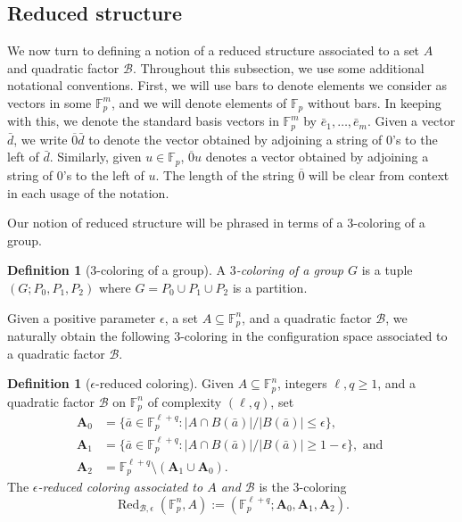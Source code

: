 \documentclass[12pt,oneside,british,a4wide]{amsart}
\numberwithin{equation}{section}
\theoremstyle{definition}
\newtheorem{definition}[theorem]{Definition}
\def\F{\mathbb{F}}
\def\e{\epsilon}
\newcommand{\abar}{\bar{a}}
\newcommand{\dbar}{\bar{d}}
\newcommand{\ebar}{\bar{e}}
\newcommand{\calB}{\mathcal{B}}
\newcommand{\Red}{{\mathrm{Red}}}
\def\Red{\operatorname{Red}}
\begin{document}
\subsection{Reduced structure}\label{ss:reduced} We now turn to defining a notion of a reduced structure associated to a set $A$ and quadratic factor $\calB$. Throughout this subsection, we use some additional notational conventions. First, we will use bars to denote elements we consider as vectors in some $\F_p^m$, and we will denote elements of $\F_p$ without bars.  In keeping with this, we denote the standard basis vectors in $\F_p^m$ by $\ebar_1,\ldots, \ebar_m$.  Given a vector  $\dbar$, we write $\overline{0}\dbar$ to denote the vector obtained by adjoining a string of $0$'s to the left of $\dbar$.  Similarly, given $u\in \F_p$,  $\overline{0}u$ denotes a vector obtained by adjoining a string of $0$'s to the left of $u$. The length of the string $\overline{0}$ will be clear from context in each usage of the notation.  

Our notion of reduced structure will be phrased in terms of a $3$-coloring of a group.

\begin{definition}[3-coloring of a group]
A \emph{$3$-coloring of a group $G$} is a tuple $(G; P_0,P_1,P_2)$ where  $G=P_0\cup P_1\cup P_2$ is a partition.
\end{definition}

Given a positive parameter $\e$, a set $A\subseteq\F_p^n$, and a quadratic factor $\calB$, we naturally obtain the following $3$-coloring in the configuration space associated to a quadratic factor $\calB$. 

\begin{definition}[$\e$-reduced coloring]\label{def:reduced}
Given $A\subseteq \mathbb{F}_p^n$, integers $\ell,q\geq 1$, and a quadratic factor $\calB$ on $\mathbb{F}_p^n$ of complexity $(\ell,q)$, set 
\begin{align*}
\mathbf{A}_0&=\{\abar \in \mathbb{F}_p^{\ell+q}: |A\cap B(\abar)|/|B(\abar)|\leq \e\},\\
\mathbf{A}_1&=\{\abar\in \mathbb{F}_p^{\ell+q}: |A\cap B(\abar)|/|B(\abar)|\geq 1-\e\},\text{ and }\\
\mathbf{A}_2&=\F_p^{\ell+q}\setminus (\mathbf{A}_1\cup \mathbf{A}_0).
\end{align*}
The \emph{$\e$-reduced coloring associated to $A$ and $\calB$}  is the $3$-coloring 
$$
\Red_{\calB,\e}(\F_p^n,A):=(\F_p^{\ell+q}; \mathbf{A}_0,\mathbf{A}_1,\mathbf{A}_2).
$$
\end{definition}
\end{document}
